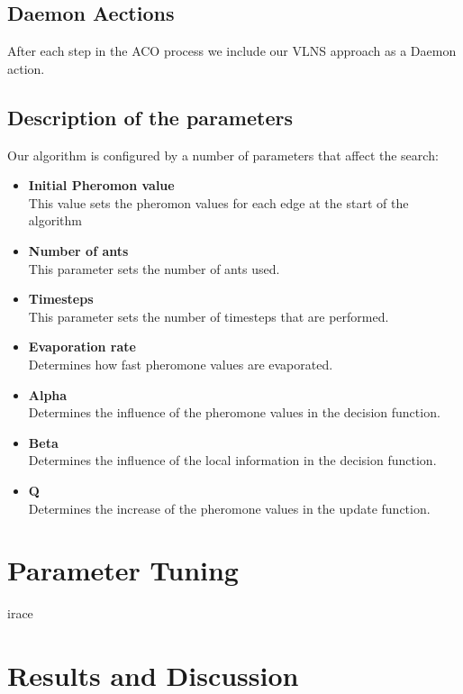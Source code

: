 \documentclass[a4paper]{scrartcl}
\begin{document}
\subsection{Daemon Aections}

After each step in the ACO process we include our VLNS approach as a Daemon action.


\subsection{Description of the parameters}
Our algorithm is configured by a number of parameters that affect the search:

\begin{itemize}
  \item \textbf{Initial Pheromon value} \\
    This value sets the pheromon values for each edge at the start of the algorithm
  \item \textbf{Number of ants} \\
    This parameter sets the number of ants used.
  \item \textbf{Timesteps} \\
    This parameter sets the number of timesteps that are performed.
  \item \textbf{Evaporation rate} \\
    Determines how fast pheromone values are evaporated.
  \item \textbf{Alpha} \\
    Determines the influence of the pheromone values in the decision function.
  \item \textbf{Beta} \\
    Determines the influence of the local information in the decision function.
  \item \textbf{Q} \\
    Determines the increase of the pheromone values in the update function.
\end{itemize}

\section{Parameter Tuning}

irace \cite{lopez2011irace}


\section{Results and Discussion}
\end{document}
